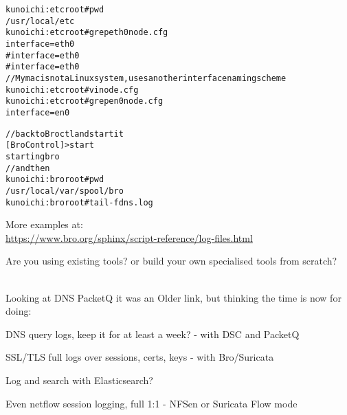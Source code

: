 \documentclass[Screen16to9,17pt]{foils}
\begin{document}

\begin{alltt}\small
kunoichi:etc root# pwd
/usr/local/etc
kunoichi:etc root# grep eth0 node.cfg
interface=eth0
#interface=eth0
#interface=eth0
// My mac is not a Linux system, uses another interface naming scheme
kunoichi:etc root# vi node.cfg
kunoichi:etc root# grep en0 node.cfg
interface=en0
\end{alltt}


\begin{alltt}\small
// back to Broctl and start it
[BroControl] > start
starting bro
// and then
kunoichi:bro root# pwd
/usr/local/var/spool/bro
kunoichi:bro root# tail -f dns.log
\end{alltt}

More examples at:\\
\url{https://www.bro.org/sphinx/script-reference/log-files.html}




Are you using existing tools? or build your own specialised tools from scratch?\\

{\footnotesize
{}\\
}



Looking at DNS PacketQ it was an Older link, but thinking the time is now for doing:

\begin{list2}
\item DNS query logs, keep it for at least a week? - with DSC and PacketQ
\item SSL/TLS full logs over sessions, certs, keys - with Bro/Suricata\\
\item Log and search with Elasticsearch?\\
\item Even netflow session logging, full 1:1 - NFSen or Suricata Flow mode
\end{list2}
\end{document}
